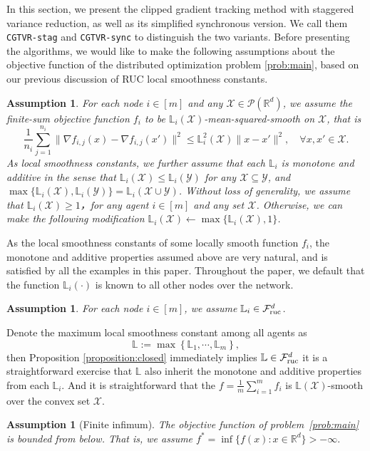 \documentclass{article}
\newtheorem{assumption}[theorem]{Assumption}
\newcommand{\cX}{\mathcal{X}}
\newcommand{\cY}{\mathcal{Y}}
\newcommand{\cF}{\mathcal{F}}
\newcommand{\bL}{\mathbb{L}}
\newcommand{\RR}{\mathbb{R}}
\newcommand{\fij}{f_{i,j}}
\begin{document}
In this section, we present the clipped gradient tracking method with staggered variance reduction, as well as its simplified synchronous version. We call them \texttt{CGTVR-stag} and \texttt{CGTVR-sync} to distinguish the two variants. Before presenting the algorithms, we would like to make the following assumptions about the objective function of the distributed optimization problem \eqref{prob:main}, based on our previous discussion of RUC local smoothness constants. 

\begin{assumption}
\label{assumption:RMSS} 
For each node $i\in[m]$ and any $\cX\in\mathcal{P}(\RR^d)$, we assume the finite-sum objective function $f_i$ to be $\bL_i(\cX)$-mean-squared-smooth on $\cX$, that is
\begin{equation} 
     \frac{1}{n_i}\sum_{j=1}^{n_i} \|\nabla \fij(x)-\nabla \fij(x') \|^2  \leq \bL_i^2(\cX)\|x-x'\|^2, \quad \forall x, x' \in \cX.\nonumber
\end{equation}  
As local smoothness constants, we further assume that each $\bL_i$ is monotone and additive in the sense that $\bL_i(\cX)\leq\bL_i(\cY)$ for any $\cX\subseteq\cY$, and $\max\{\bL_i(\cX),\bL_i(\cY)\} = \bL_i(\cX\cup\cY)$. Without loss of generality, we
assume that $\bL_i(\cX)\geq1$，for any agent $i\in[m]$ and any set $\cX$. Otherwise, we can make the following modification $\bL_i(\cX) \leftarrow \max\{\bL_i(\cX),1\}$.
\end{assumption}
\noindent As the local smoothness constants of some locally smooth function $f_i$, the monotone and additive properties assumed above are very natural, and is satisfied by all the examples in this paper. 
Throughout the paper, we default that the function $\bL_i(\cdot)$ is known to all other nodes over the network.  

\begin{assumption}
    \label{assumption:RUC}
    For each node $i\in[m]$, we assume $\bL_i\in\cF_{\rm ruc}^d$. 
\end{assumption}
\noindent Denote the maximum local smoothness constant among all agents as
\begin{equation}
    \label{eqn:max-L}
    \bL := \max\left\{\bL_1,\cdots,\bL_m\right\},
\end{equation}
then Proposition \ref{proposition:closed} immediately implies $\bL\in\cF_{\rm ruc}^d$ it is a straightforward exercise that $\bL$ also inherit the monotone and additive properties from each $\bL_i$. And it is straightforward that the $f = \frac{1}{m}\sum_{i=1}^mf_i$ is $\bL(\cX)$-smooth over the convex set $\cX$. 
\begin{assumption}[Finite infimum]
\label{ass:existence-minimizer}
The objective function  of problem~\eqref{prob:main} is bounded from below. That is, we assume $f^* = \inf\{f(x):x\in\mathbb{R}^d\}>-\infty.$
\end{assumption}
\end{document}
